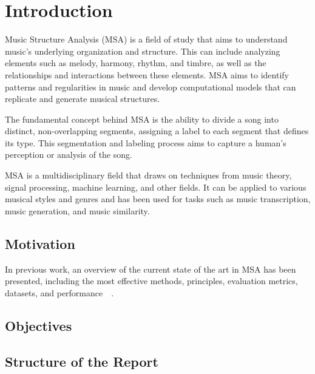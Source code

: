 \normallinespacing

\chapter{Introduction}

Music Structure Analysis (MSA) is a field of study that aims to understand music's underlying organization and structure. This can include analyzing elements such as melody, harmony, rhythm, and timbre, as well as the relationships and interactions between these elements. MSA aims to identify patterns and regularities in music and develop computational models that can replicate and generate musical structures.

The fundamental concept behind MSA is the ability to divide a song into distinct, non-overlapping segments, assigning a label to each segment that defines its type. This segmentation and labeling process aims to capture a human's perception or analysis of the song.

MSA is a multidisciplinary field that draws on techniques from music theory, signal processing, machine learning, and other fields. It can be applied to various musical styles and genres and has been used for tasks such as music transcription, music generation, and music similarity. 

\section{Motivation}

In previous work, an overview of the current state of the art in MSA has been presented, including the most effective methods, principles, evaluation metrics, datasets, and performance~\cite{Nieto2020}~\cite{Chaki2021}.

\section{Objectives}

\section{Structure of the Report}


\newpage


